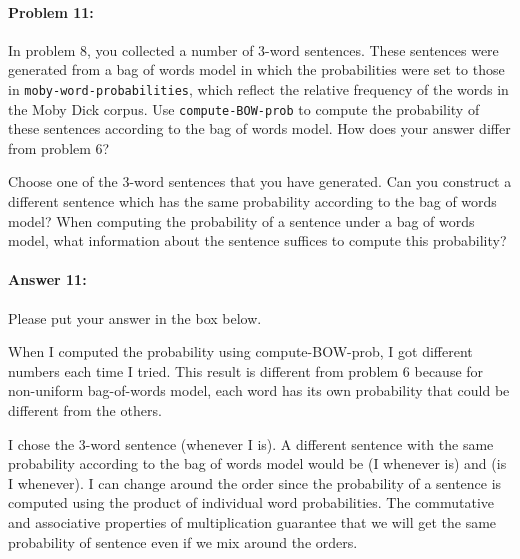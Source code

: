 \documentclass[10pt]{article}
\newenvironment{AnswerBox}{\begin{mdframed}[style=simple]}{\end{mdframed}}
\begin{document}
\hrulefill %

\paragraph{Problem 11:}

In problem 8, you collected a number of 3-word sentences. These
sentences were generated from a bag of words model in which the
probabilities were set to those in \texttt{moby-word-probabilities},
which reflect the relative frequency of the words in the Moby Dick
corpus. Use \texttt{compute-BOW-prob} to compute the probability of
these sentences according to the bag of words model. How does your
answer differ from problem 6?

Choose one of the 3-word sentences that you have generated. Can you
construct a different sentence which has the same probability
according to the bag of words model? When computing the probability of
a sentence under a bag of words model, what information about the
sentence suffices to compute this probability?

\paragraph{Answer 11:} Please put your answer in the box below.

\begin{AnswerBox}%

    When I computed the probability using compute-BOW-prob, I got different numbers each time I tried. This result is different from problem 6 because for non-uniform bag-of-words model, each word has its own probability that could be different from the others. 

    I chose the 3-word sentence (whenever I is). A different sentence with the same probability according to the bag of words model would be (I whenever is) and (is I whenever). I can change around the order since the probability of a sentence is computed using the product of individual word probabilities. The commutative and associative properties of multiplication guarantee that we will get the same probability of sentence even if we mix around the orders.
   
\end{AnswerBox}%
\end{document}
